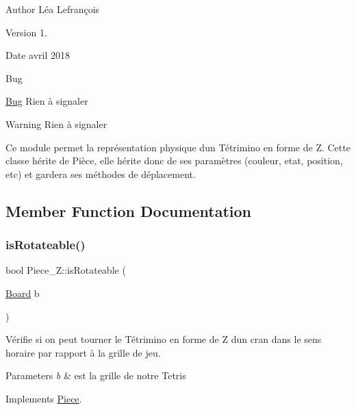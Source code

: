 \begin{DoxyAuthor}{Author}
Léa Lefrançois 
\end{DoxyAuthor}
\begin{DoxyVersion}{Version}
1. 
\end{DoxyVersion}
\begin{DoxyDate}{Date}
avril 2018 
\end{DoxyDate}
\begin{DoxyRefDesc}{Bug}
\item[\hyperlink{bug__bug000015}{Bug}]Rien à signaler \end{DoxyRefDesc}
\begin{DoxyWarning}{Warning}
Rien à signaler
\end{DoxyWarning}
Ce module permet la représentation physique d\textquotesingle{}un Tétrimino en forme de Z. Cette classe hérite de Pièce, elle hérite donc de ses paramètres (couleur, etat, position, etc) et gardera ses méthodes de déplacement. 

\subsection{Member Function Documentation}
\mbox{\label{classPiece__Z_aa70256d6f49dacad685a15c5ae8df06d}} 
\subsubsection{\texorpdfstring{is\+Rotateable()}{isRotateable()}}
{\footnotesize\ttfamily bool Piece\+\_\+\+Z\+::is\+Rotateable (\begin{DoxyParamCaption}\item[{\hyperlink{classBoard}{Board}}]{b }\end{DoxyParamCaption})\hspace{0.3cm}{\ttfamily [virtual]}}



Vérifie si on peut tourner le Tétrimino en forme de Z d\textquotesingle{}un cran dans le sens horaire par rapport à la grille de jeu. 


\begin{DoxyParams}{Parameters}
{\em b} & est la grille de notre Tetris \\
\hline
\end{DoxyParams}


Implements \hyperlink{classPiece_a56cdf7f4234fe848a3e203b693b7a862}{Piece}.

